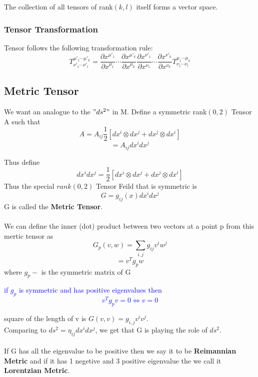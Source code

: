 \documentclass{article}
\newcommand\note[1]{\textcolor{blue}{#1}}
\begin{document}
The collection of all tensors of rank$(k,l)$ itself  forms a vector space. 
\subsubsection{Tensor Transformation}
Tensor follows the following transformation rule:
\[
T^{\mu'_1 \cdots \mu'_k}_{\nu'_1 \cdots \nu'_l} = \frac{\partial x^{\mu'_1}}{\partial x^{\mu_1}}  \cdots  \frac{\partial x^{\mu'_k} }{\partial x^{\mu_k}} \frac{\partial x^{\nu'_1}}{\partial x^{\nu_1}}  \cdots  \frac{\partial x^{\nu'_k} }{\partial x^{\nu_k}}  T^{\mu_1 \cdots \mu_k}_{\nu_1 \cdots \nu_l} 
\]

\subsection{Metric Tensor}
We want an analogue to the $"ds^2"$ in M. Define a symmetric rank$(0,2)$ Tensor A such that 
$$A = A_{ij} \frac{1}{2}[dx^i \otimes dx^j + dx^j \otimes dx^i ]$$
$$= A_{ij} dx^idx^j$$

Thus define $$dx^idx^j = \frac{1}{2}[dx^i \otimes dx^j + dx^j \otimes dx^i ]$$
Thus the special $rank (0,2)$ Tensor Feild that is symmetric is $$G = g_{ij}(x) dx^idx^j $$
G is called the \textbf{Metric Tensor}.\\ \\
We can define the inner (dot) product between two vectors at a point p from this mertic tensor as $$G_p(v,w) = \sum _{i,j} g_{ij} v^iw^j$$
$$= v^T g_p w$$ where $g_p-$ is the symmetric matrix of G

\note{if $g_p$ is symmetric and has positive eigenvalues then $$v^T g_p v = 0 \iff v=0$$                  }

square of the length of v is $G(v,v) = g_{i,j} v^iv^j$.\\
Comparing to $ds^2 = \eta_{ij} dx^idx^j$, we get that G is playing the role of $ ds^2$.
\\ \\
If G has all the eigenvalue to be positive then we say it to be \textbf{Reimannian Metric} and if it has 1 negetive and 3 positive eigenvalue the we call it \textbf{Lorentzian Metric}.
\end{document}
